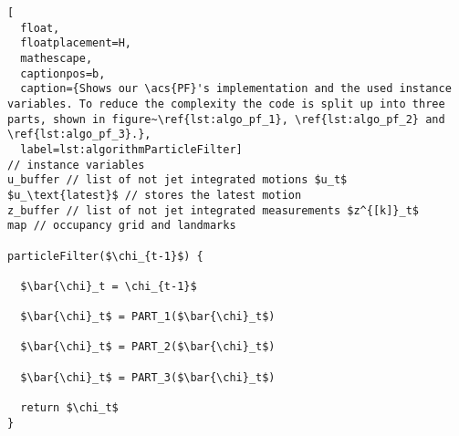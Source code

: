 \begin{lstlisting}[
  float,
  floatplacement=H,
  mathescape,
  captionpos=b,
  caption={Shows our \acs{PF}'s implementation and the used instance variables. To reduce the complexity the code is split up into three parts, shown in figure~\ref{lst:algo_pf_1}, \ref{lst:algo_pf_2} and \ref{lst:algo_pf_3}.},
  label=lst:algorithmParticleFilter]
// instance variables
u_buffer // list of not jet integrated motions $u_t$
$u_\text{latest}$ // stores the latest motion
z_buffer // list of not jet integrated measurements $z^{[k]}_t$
map // occupancy grid and landmarks

particleFilter($\chi_{t-1}$) {

  $\bar{\chi}_t = \chi_{t-1}$

  $\bar{\chi}_t$ = PART_1($\bar{\chi}_t$)

  $\bar{\chi}_t$ = PART_2($\bar{\chi}_t$)

  $\bar{\chi}_t$ = PART_3($\bar{\chi}_t$)

  return $\chi_t$
}
\end{lstlisting}
